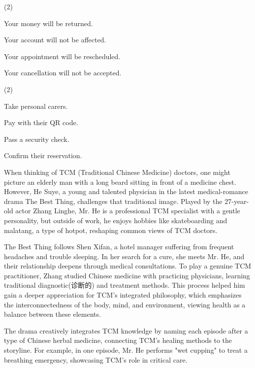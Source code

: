 \documentclass{英语试卷}
\begin{document}
\begin{choices}(2)
  \item Your money will be returned.
  \item Your account will not be affected.
  \item Your appointment will be rescheduled.
  \item Your cancellation will not be accepted.
\end{choices}
\begin{choices}(2)
  \item Take personal carers.
  \item Pay with their QR code.
  \item Pass a security check.
  \item Confirm their reservation.
\end{choices}
\par When thinking of TCM (Traditional Chinese Medicine) doctors, one might picture an elderly man with a long beard sitting in front of a medicine chest. However, He Suye, a young and talented physician in the latest medical-romance drama The Best Thing, challenges that traditional image. Played by the 27-year-old actor Zhang Linghe, Mr. He is a professional TCM specialist with a gentle personality, but outside of work, he enjoys hobbies like skateboarding and malatang, a type of hotpot, reshaping common views of TCM doctors.\par
\par The Best Thing follows Shen Xifan, a hotel manager suffering from frequent headaches and trouble sleeping. In her search for a cure, she meets Mr. He, and their relationship deepens through medical consultations. To play a genuine TCM practitioner, Zhang studied Chinese medicine with practicing physicians, learning traditional diagnostic(诊断的) and treatment methods. This process helped him gain a deeper appreciation for TCM's integrated philosophy, which emphasizes the interconnectedness of the body, mind, and environment, viewing health as a balance between these elements.\par
\par The drama creatively integrates TCM knowledge by naming each episode after a type of Chinese herbal medicine, connecting TCM's healing methods to the storyline. For example, in one episode, Mr. He performs "wet cupping" to treat a breathing emergency, showcasing TCM's role in critical care.\par
\end{document}

